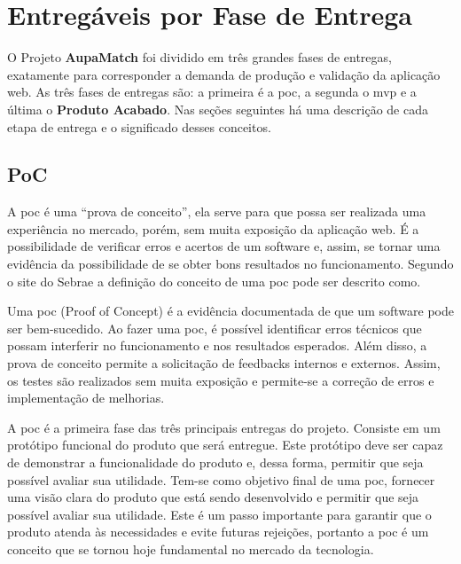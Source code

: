     \section{Entregáveis por Fase de Entrega}
    O Projeto \textbf{AupaMatch} foi dividido em três grandes fases de entregas, exatamente para corresponder a demanda de produção e validação da aplicação web. As três fases de entregas são: a primeira é a \gls{poc}, a segunda o \gls{mvp} e a última o \textbf{Produto Acabado}. Nas seções seguintes há uma descrição de cada etapa de entrega e o significado desses conceitos.

    \subsection{PoC}
    A \ac{poc} é uma “prova de conceito”, ela serve para que possa ser realizada uma experiência no mercado, porém, sem muita exposição da aplicação web. É a possibilidade de verificar erros e acertos de um software e, assim, se tornar uma evidência da possibilidade de se obter bons resultados no funcionamento.
    Segundo o site do Sebrae a definição do conceito de uma \ac{poc} pode ser descrito como.
    
    \begin{citacao}
        Uma \ac{poc} (Proof of Concept) é a evidência documentada de que um software pode ser bem-sucedido. Ao fazer uma \ac{poc}, é possível identificar erros técnicos que possam interferir no funcionamento e nos resultados esperados. Além disso, a prova de conceito permite a solicitação de \gls{feedbacks} internos e externos. Assim, os testes são realizados sem muita exposição e permite-se a correção de erros e implementação de melhorias.
        \cite{sebrae2018}
    \end{citacao}
    
    A \ac{poc} é a primeira fase das três principais entregas do projeto. Consiste em um protótipo funcional do produto que será entregue. Este protótipo deve ser capaz de demonstrar a funcionalidade do produto e, dessa forma, permitir que seja possível avaliar sua utilidade. Tem-se como objetivo final de uma \ac{poc}, fornecer uma visão clara do produto que está sendo desenvolvido e permitir que seja possível avaliar sua utilidade. Este é um passo importante para garantir que o produto atenda às necessidades e evite futuras rejeições, portanto a \ac{poc} é um conceito que se tornou hoje fundamental no mercado da tecnologia.
        
